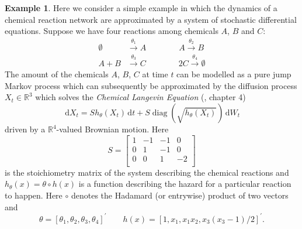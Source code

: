 \documentclass[preprint]{imsart}
\renewcommand{\th}{\theta}
\newcommand{\RR}{\mathbb{R}}
\theoremstyle{definition}
\newtheorem{ex}[thm]{Example}
\newcommand{\dd}{{\,\mathrm d}}
\newcommand{\T}{{\prime}}
\begin{document}
\begin{ex}\label{ex:chemreaction}
Here we consider a simple example in which the dynamics of a chemical reaction network are approximated by a system of stochastic differential equations.   Suppose we have four reactions among chemicals $A$, $B$ and $C$:
\begin{align*} 
 \emptyset & \stackrel{\th_1}{\rightarrow} A  \qquad \qquad
 A  \stackrel{\th_2}{\rightarrow} B \\
 A + B  & \stackrel{\th_3}{\rightarrow} C \qquad \qquad 2 C   \stackrel{\th_4}{\rightarrow} \emptyset
\end{align*}
The amount of the chemicals $A$, $B$, $C$ at time $t$ can be modelled as a pure jump Markov process which can subsequently be approximated by the  diffusion process $X_t \in \RR^3$ which solves the \emph{Chemical Langevin Equation} (\cite{Fuchs}, chapter 4)
\begin{equation}\label{prokarsde}	 \dd X_t = S h_\th(X_t) \dd t + S \operatorname{diag}  (\sqrt{h_\th(X_t)})  \dd W_t 
\end{equation}
driven by a $\RR^4$-valued Brownian motion. Here
\[ S = \begin{bmatrix}  1 & -1 & -1 & 0 \\
0 & 1 & - 1&0 \\
0 & 0 & 1 & -2\\
\end{bmatrix} \]
 is the stoichiometry matrix of the system describing the  chemical reactions
and $h_\th(x) =\th \circ h(x)$
is a function describing the hazard for a particular reaction to happen.
Here $\circ$ denotes the Hadamard (or entrywise) product of two vectors and
\[\th = [\th_1, \th_2, \th_3, \th_4]^\T \qquad h(x) =[1,  x_1,  x_1 x_2,  x_3(x_3-1)/2]^\T. \]


\end{ex}
\end{document}
